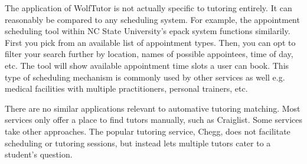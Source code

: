 The application of WolfTutor is not actually specific to tutoring entirely.
It can reasonably be compared to any scheduling system.
For example, the appointment scheduling tool within NC State University's epack system functions similarily.
First you pick from an available list of appointment types. Then, you can opt to filter your search further by location, names of possible appointees, time of day, etc.
The tool will show available appointment time slots a user can book.
This type of scheduling mechanism is commonly used by other services as well e.g. medical facilities with multiple practitioners, personal trainers, etc.

There are no similar applications relevant to automative tutoring matching. Most services only offer a place to find tutors manually, such as Craiglist. Some services take other approaches. The popular tutoring service, Chegg, does not facilitate scheduling or tutoring sessions, but instead lets multiple tutors cater to a student's question. 



